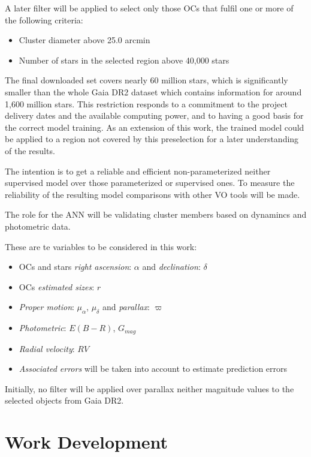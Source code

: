 \documentclass[11pt, a4paper, english]{book}
\begin{document}
A later filter will be applied to select only those OCs that fulfil one or more of the following criteria:

\begin{itemize}
  \item Cluster diameter above 25.0 arcmin
  \item Number of stars in the selected region above 40,000 stars
\end{itemize}

The final downloaded set covers nearly 60 million stars, which is significantly smaller than the whole Gaia DR2 dataset which contains
information for around 1,600 million stars.
This restriction responds to a commitment to the project delivery dates and the available computing power,
and to having a good basis for the correct model training. As an extension of this work, the trained model could be applied to a region
not covered by this preselection for a later understanding of the results.

The intention is to get a reliable and efficient non-parameterized neither supervised model over those parameterized or supervised ones.
To measure the reliability of the resulting model comparisons with other VO tools will be made.

The role for the ANN will be validating cluster members based on dynamincs and photometric data.

These are te variables to be considered in this work:

\begin{itemize}
  \item OCs and stars \emph{right ascension}: $\alpha$ and \emph{declination}: $\delta$
  \item OCs \emph{estimated sizes}: $r$
  \item \emph{Proper motion}: $\mu_{\alpha}$, $\mu_{\delta}$ and \emph{parallax}: $\varpi$
  \item \emph{Photometric}: $E(B-R)$, $G_{mag}$
  \item \emph{Radial velocity}: $RV$
  \item \emph{Associated errors} will be taken into account to estimate prediction errors
\end{itemize}

Initially, no filter will be applied over parallax neither magnitude values to the selected objects from Gaia DR2.

\chapter{Work Development}
\end{document}
